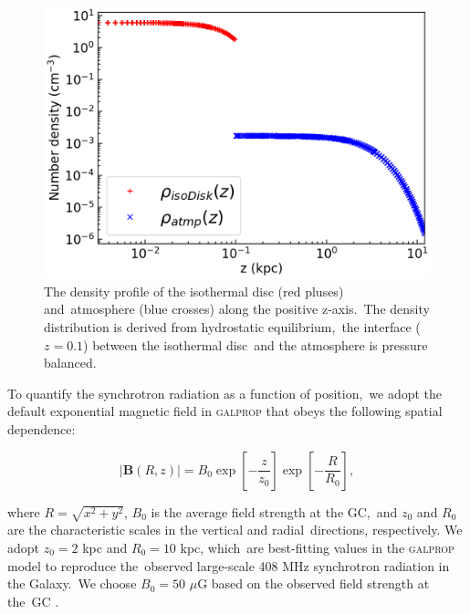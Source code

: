 \documentclass[twocolumn]{aastex631}
\begin{document}
  \begin{figure}
    \includegraphics[width=\columnwidth]{figures/fig__initial-density-profile.png}
    \caption{The density profile of the isothermal disc (red pluses) and\
             atmosphere (blue crosses) along the positive z-axis.\
             The density distribution is derived from hydrostatic equilibrium,\
             the interface ($z=0.1$) between the isothermal disc\
             and the atmosphere is pressure balanced.}
    \label{fig__initial-density-profile}
  \end{figure}



  To quantify the synchrotron radiation as a function of position,\
  we adopt the default exponential magnetic field in \textsc{galprop} \citep{Strong2007}
  that obeys the following spatial dependence:\

  \begin{equation}
     |\mathbf{B}(R, z)|=B_{0}\exp\left[-\frac{z}{z_{0}}\right]\exp\left[-\frac{R}{R_{0}}\right],
     \label{magnetic-field}
  \end{equation}


  where $R=\sqrt{x^{2}+y^{2}}$, $B_{0}$ is the average field strength at the GC,\
  and $z_{0}$ and $R_{0}$ are the characteristic scales in the vertical and radial\
  directions, respectively. We adopt $z_{0} = 2$ kpc and $R_{0} = 10$ kpc, which\
  are best-fitting values in the \textsc{galprop} model to reproduce the\
  observed large-scale 408 MHz synchrotron radiation in the Galaxy.\
  We choose $B_{0} = 50$ $\mu$G based on the observed field strength at the\
  GC \citep{Crocker2010}.
\end{document}
